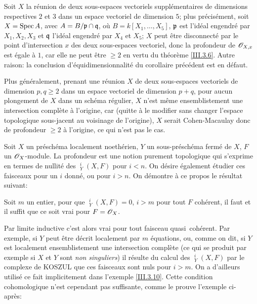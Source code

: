 \begin{exemple} \label{III.3.10}
Soit $X$ la r\'eunion de deux sous-espaces vectoriels suppl\'ementaires de dimensions respectives $2$ et $3$ dans un espace vectoriel de dimension $5$; plus pr\'ecis\'ement, soit $X=\operatorname{Spec} A$, avec $A=B/{\mathfrak{p} \cap \mathfrak{q}}$, o\`u $B=k[X_1, \ldots, X_5]$, $\mathfrak{p}$ est l'id\'eal engendr\'e par $X_1, X_2, X_3$ et $\mathfrak{q}$ l'id\'eal engendr\'e par $X_4$ et $X_5$; $X$ peut \^etre disconnect\'e par le point d'intersection $x$ des deux sous-espaces vectoriel, donc la profondeur de ${\mathscr O}_{X, x}$ est \'egale \`a $1$, car elle ne peut \^etre $\geq 2$ en vertu du th\'eor\`eme \ref{III.3.6}. Autre raison: la conclusion d'\'equidimensionnalit\'e du corollaire pr\'ec\'edent est en d\'efaut.

Plus g\'en\'eralement, prenant une r\'eunion $X$ de deux sous-espaces vectoriels de dimension $p, q\geq 2$ dans un espace vectoriel de dimension $p+q$, pour aucun plongement de $X$ dans un sch\'ema r\'egulier, $X$ n'est m\^eme ensemblistement une intersection compl\`ete \`a l'origine, car (quitte \`a le modifier sans changer l'espace topologique sous-jacent au voisinage de l'origine), $X$ serait Cohen-Macaulay donc de profondeur $\geq 2$ \`a l'origine, ce qui n'est pas le cas.
\end{exemple}

\begin{remarque} \label{III.3.11}
Soit $X$ un pr\'esch\'ema localement noeth\'erien, $Y$ un sous-pr\'esch\'ema ferm\'e de $X$, $F$ un $\mathscr{O}_X$-module. La profondeur est une notion purement topologique qui s'exprime en termes de nullit\'e des $\mathop{\underline{\mathrm{H}}}\nolimits_Y^i(X, F)$ pour $i<n$. On d\'esire \'egalement \'etudier ces faisceaux pour un $i$ donn\'e, ou pour $i>n$. On d\'emontre \`a ce propos le r\'esultat suivant:
\end{remarque}

\begin{lemme} \label{III.3.12}
Soit $m$ un entier, pour que $\mathop{\underline{\mathrm{H}}}\nolimits_Y^i(X, F)=0$, $i>m$ pour tout $F$ coh\'erent, il faut et il suffit que ce soit vrai pour $F=\mathscr{O}_X$.
\end{lemme}

Par limite inductive c'est alors vrai pour tout faisceau quasi~coh\'erent. Par exemple, si $Y$ peut \^etre d\'ecrit localement par $m$ \'equations, ou, comme on dit, si $Y$ est localement ensemblistement une intersection compl\`ete (ce qui se produit par exemple si $X$ et $Y$ sont \emph{non singuliers}) il r\'esulte du calcul des $\mathop{\underline{\mathrm{H}}}\nolimits_Y^i(X, F)$ par le complexe de KOSZUL que ces faisceaux sont nuls pour $i>m$. On a d'ailleurs utilis\'e ce fait implicitement dans l'exemple \ref{III.3.10}. Cette condition cohomologique n'est cependant pas suffisante, comme le prouve l'exemple ci-apr\`es:

